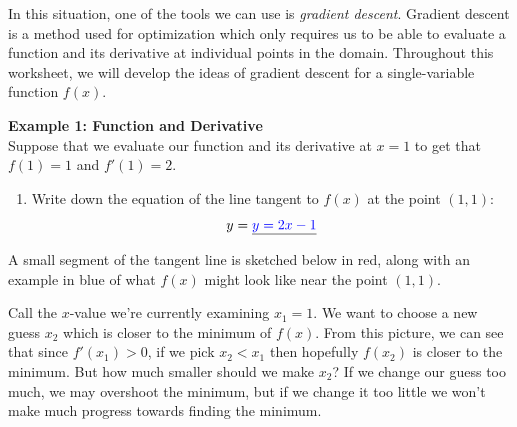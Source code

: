 \documentclass[11pt]{article}
\begin{document}
In this situation, one of the tools we can use is \textit{gradient descent}. Gradient descent is a method used for optimization which only requires us to be able to evaluate a function and its derivative at individual points in the domain. Throughout this worksheet, we will develop the ideas of gradient descent for a single-variable function $f(x)$.

{\bf Example 1: Function and Derivative}\\

Suppose that we evaluate our function and its derivative at $x=1$ to get that $f(1) = 1$ and $f'(1) = 2$.

\begin{enumerate}
\item Write down the equation of the line tangent to $f(x)$ at the point $(1,1)$:
\[
    y = \underline{{\color{blue}y = 2x  -1}}
\]
\end{enumerate}

A small segment of the tangent line is sketched below in red, along with an example in blue of what $f(x)$ might look like near the point $(1,1)$.

\begin{center}
\end{center}

Call the $x$-value we're currently examining $x_1=1$. We want to choose a new guess $x_2$ which is closer to the minimum of $f(x)$.
From this picture, we can see that since $f'(x_1)>0$, if we pick $x_2 < x_1$ then hopefully  $f(x_2)$ is closer to the minimum. But how much smaller should we make $x_2$? If we change our guess too much, we may overshoot the minimum, but if we change it too little we won't make much progress towards finding the minimum. 
\end{document}
